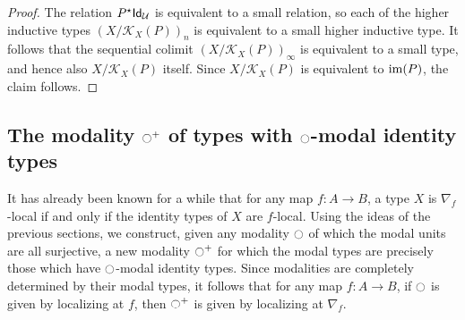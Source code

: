 \begin{proof}
The relation $P^\star\mathsf{Id}_{\mathcal{U}}$ is equivalent to a small relation, so each of the higher inductive types $(X/\mathcal{K}_X(P))_n$ is equivalent to a small higher inductive type. It follows that the sequential colimit $(X/\mathcal{K}_X(P))_\infty$ is equivalent to a small type, and hence also $X/\mathcal{K}_X(P)$ itself. Since $X/\mathcal{K}_X(P)$ is equivalent to $\operatorname{im}(P)$, the claim follows.
\end{proof}

\subsection{The modality ${\ocircle}^+$ of types with ${\ocircle}$-modal identity types}

It has already been known for a while that for any map $f:A\to B$, a type $X$ is $\nabla_f$-local if and only if the identity types of $X$ are $f$-local. Using the ideas of the previous sections, we construct, given any modality ${\ocircle}$ of which the modal units are all surjective, a new modality ${\ocircle}^+$ for which the modal types are precisely those which have ${\ocircle}$-modal identity types. Since modalities are completely determined by their modal types, it follows that for any map $f:A\to B$, if ${\ocircle}$ is given by localizing at $f$, then ${\ocircle}^+$ is given by localizing at $\nabla_f$. 

